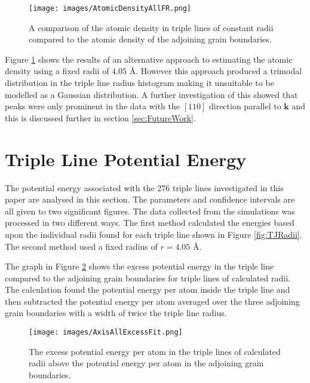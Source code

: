 \documentclass[12pt,a4paper,openany]{report}
\begin{document}
\begin{figure}[H]
	\centering
	\texttt{[image: images/AtomicDensityAllFR.png]} 	
	\caption{A comparison of the atomic density in triple lines of constant radii  compared to the atomic density of the adjoining grain boundaries.}
	\label{fig:AtomicDensityFR}
\end{figure}

Figure \ref{fig:AtomicDensityFR} shows the results of an alternative approach to estimating the atomic density using a fixed radii of $4.05 \textrm{ \AA}$. However this approach produced a trimodal distribution in the triple line radius histogram making it unsuitable to be modelled as a Gaussian distribution. A further investigation of this showed that peaks were only prominent in the data with the $[110]$ direction parallel to $\mathbf{k}$ and this is discussed further in section \ref{sec:FutureWork}. 



\newpage
\section{Triple Line Potential Energy} \label{sec:TLPE}

The potential energy associated with the 276 triple lines investigated in this paper are analysed in this section. The parameters and confidence intervals are all given to two significant figures. The data collected from the simulations was processed in two different ways. The first method calculated the energies based upon the individual radii found for each triple line shown in Figure \ref{fig:TJRadii}. The second method used a fixed radius of $r = 4.05 \textrm{ \AA}$. 

The graph in Figure \ref{fig:ExcessPEVR} shows the excess potential energy in the triple line compared to the adjoining grain boundaries for triple lines of calculated radii. The calculation found the potential energy per atom inside the triple line and then subtracted the potential energy per atom averaged over the three adjoining grain boundaries with a width of twice the triple line radius. 
 

\begin{figure}[H]
	\texttt{[image: images/AxisAllExcessFit.png]}
	\caption{The excess potential energy per atom in the triple lines of calculated radii above the potential energy per atom in the adjoining grain boundaries.} 
	\label{fig:ExcessPEVR}
\end{figure}
\end{document}
